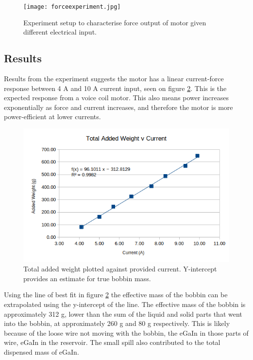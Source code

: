 \documentclass[a4paper,12pt]{article}
\begin{document}
\begin{figure}[h!]
    \centering
    \texttt{[image: forceexperiment.jpg]}
    \caption{Experiment setup to characterise force output of motor given different electrical input.}
    \label{fg:forceexperiment}
\end{figure}

\subsection{Results}

Results from the experiment suggests the motor has a linear current-force response between 4 A and 10 A current input, seen on figure \ref{fg:forceplot}. This is the expected response from a voice coil motor. This also means power increases exponentially as force and current increases, and therefore the motor is more power-efficient at lower currents.

\begin{figure}[h!]
    \centering
    \includegraphics[width=\textwidth]{resultforcevcurrent.png}
    \caption{Total added weight plotted against provided current. Y-intercept provides an estimate for true bobbin mass.}
    \label{fg:forceplot}
\end{figure}

Using the line of best fit in figure \ref{fg:forceplot} the effective mass of the bobbin can be extrapolated using the y-intercept of the line. The effective mass of the bobbin is approximately 312 g, lower than the sum of the liquid and solid parts that went into the bobbin, at approximately 260 g and 80 g respectively. This is likely because of the loose wire not moving with the bobbin, the eGaIn in those parts of wire, eGaIn in the reservoir. The small spill also contributed to the total dispensed mass of eGaIn.
\end{document}
